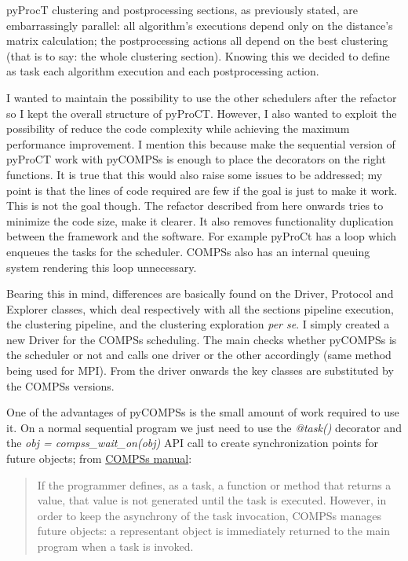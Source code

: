 pyProcT clustering and postprocessing sections, as previously stated, are embarrassingly parallel: all algorithm's executions depend only on the distance's matrix calculation; the postprocessing actions all depend on the best clustering (that is to say: the whole clustering section). Knowing this we decided to define as task each algorithm execution and each postprocessing action.

I wanted to maintain the possibility to use the other schedulers after the refactor so I kept the overall structure of pyProCT. However, I also wanted to exploit the possibility of reduce the code complexity while achieving the maximum performance improvement. I mention this because make the sequential version of pyProCT work with pyCOMPSs is enough to place the decorators on the right functions. It is true that this would also raise some issues to be addressed; my point is that the lines of code required are few if the goal is just to make it work. This is not the goal though. The refactor described from here onwards tries to minimize the code size, make it clearer. It also removes functionality duplication between the framework and the software. For example pyProCt has a loop which enqueues the tasks for the scheduler. COMPSs also has an internal queuing system rendering this loop unnecessary.

Bearing this in mind, differences are basically found on the Driver, Protocol and Explorer classes, which deal respectively with all the sections pipeline execution, the clustering pipeline, and the clustering exploration \textit{per se}. I simply created a new Driver for the COMPSs scheduling. The main checks whether pyCOMPSs is the scheduler or not and calls one driver or the other accordingly (same method being used for MPI). From the driver onwards the key classes are substituted by the COMPSs versions.

One of the advantages of pyCOMPSs is the small amount of work required to use it. On a normal sequential program we just need to use the \textit{@task()} decorator and the \textit{obj = compss\_wait\_on(obj)} API call to create synchronization points for future objects; from \hyperref[sec:docs]{COMPSs manual}: 

\begin{quote} 
If the programmer defines, as a task, a function or method that returns a value, that value is not generated until the task is executed. However, in order to keep the asynchrony of the task invocation, COMPSs manages future objects: a representant object is immediately returned to the main program when a task is invoked.
\end{quote}

